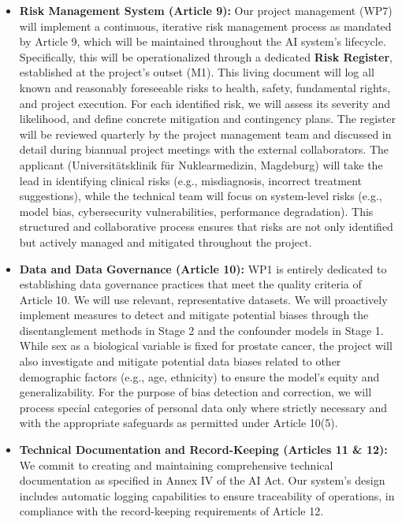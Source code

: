 \documentclass[11pt, a4paper]{article}
\begin{document}
\begin{itemize}
    \item \textbf{Risk Management System (Article 9):} Our project management (WP7) will implement a continuous, iterative risk management process as mandated by Article 9, which will be maintained throughout the AI system’s lifecycle. Specifically, this will be operationalized through a dedicated \textbf{Risk Register}, established at the project's outset (M1). This living document will log all known and reasonably foreseeable risks to health, safety, fundamental rights, and project execution. For each identified risk, we will assess its severity and likelihood, and define concrete mitigation and contingency plans. The register will be reviewed quarterly by the project management team and discussed in detail during biannual project meetings with the external collaborators. The applicant (Universitätsklinik für Nuklearmedizin, Magdeburg) will take the lead in identifying clinical risks (e.g., misdiagnosis, incorrect treatment suggestions), while the technical team will focus on system-level risks (e.g., model bias, cybersecurity vulnerabilities, performance degradation). This structured and collaborative process ensures that risks are not only identified but actively managed and mitigated throughout the project.

    \item \textbf{Data and Data Governance (Article 10):} WP1 is entirely dedicated to establishing data governance practices that meet the quality criteria of Article 10. We will use relevant, representative datasets. We will proactively implement measures to detect and mitigate potential biases through the disentanglement methods in Stage 2 and the confounder models in Stage 1. While sex as a biological variable is fixed for prostate cancer, the project will also investigate and mitigate potential data biases related to other demographic factors (e.g., age, ethnicity) to ensure the model's equity and generalizability. For the purpose of bias detection and correction, we will process special categories of personal data only where strictly necessary and with the appropriate safeguards as permitted under Article 10(5).

    \item \textbf{Technical Documentation and Record-Keeping (Articles 11 \& 12):} We commit to creating and maintaining comprehensive technical documentation as specified in Annex IV of the AI Act. Our system's design includes automatic logging capabilities to ensure traceability of operations, in compliance with the record-keeping requirements of Article 12.


\end{itemize}
\end{document}
